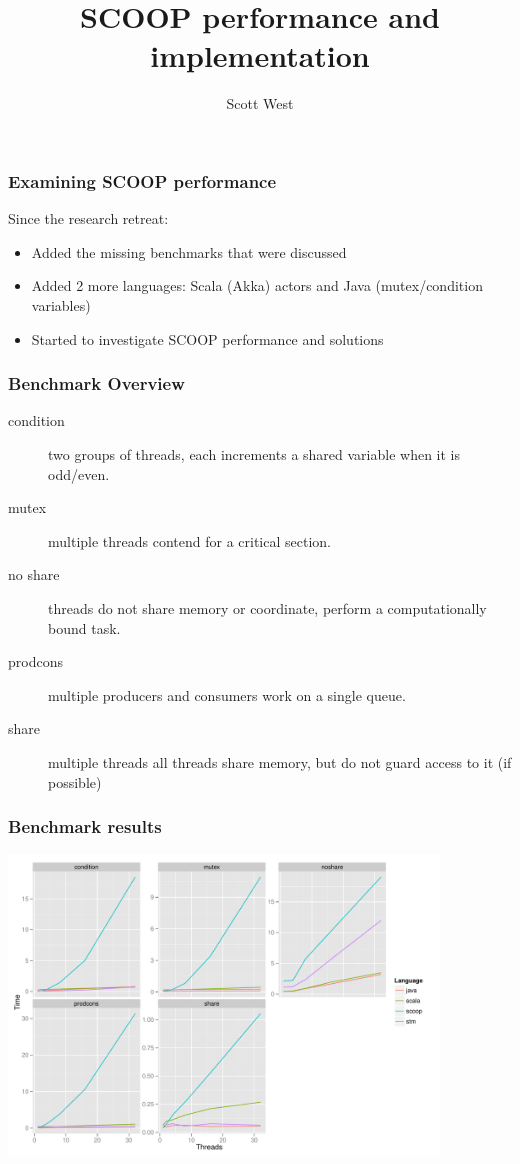 \documentclass{beamer}
\title{SCOOP performance and implementation}
\author{Scott West}
\institute{ETH Z\"{u}rich}
\begin{document}
\maketitle

\begin{frame}
  \frametitle{Examining SCOOP performance}
  
  Since the research retreat:
  \begin{itemize}[<+->]
  \item Added the missing benchmarks that were discussed
  \item Added 2 more languages: Scala (Akka) actors and Java (mutex/condition variables)
  \item Started to investigate SCOOP performance and solutions
  \end{itemize}
\end{frame}


\begin{frame}
  \frametitle{Benchmark Overview}

  \begin{description}
  \item[condition] two groups of threads, each increments a shared variable when it is odd/even.
  \item[mutex] multiple threads contend for a critical section.
  \item[no share] threads do not share memory or coordinate, perform a computationally bound task.
  \item[prodcons] multiple producers and consumers work on a single queue.
  \item[share] multiple threads all threads share memory, but do not guard access to it (if possible)
  \end{description}
\end{frame}


\begin{frame}
  \frametitle{Benchmark results}
  \begin{center}
    \includegraphics[width=4.5in]{time-facet-old}
  \end{center}
\end{frame}
\end{document}
